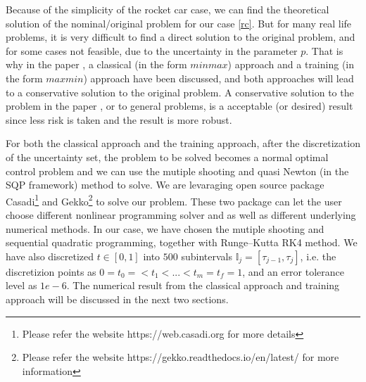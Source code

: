 \documentclass  [
  paper    = a4,
  BCOR     = 10mm,
  twoside,
  fontsize = 12pt,
  fleqn,
  toc      = bibnumbered,
  toc      = listofnumbered,
  numbers  = noendperiod,
  headings = normal,
  listof   = leveldown,
  version  = 3.03
]                                       {scrreprt}
\newcommand{\<}{\langle}
\renewcommand{\>}{\rangle}
\begin{document}

Because of the simplicity of the rocket car case, we can find the theoretical solution of the nominal/original problem for our case \ref{rc}. But for many real life problems, it is very difficult to find a direct solution to the original problem, and for some cases not feasible, due to the uncertainty in the parameter $p$. That is why in the paper \cite{MatSch22}, a classical (in the form $minmax$) approach and a training (in the form $maxmin$) approach have been discussed, and both approaches will lead to a conservative solution to the original problem. A conservative solution to the problem in the paper \cite{MatSch22}, or to general problems,  is a acceptable (or desired) result since less risk is taken and the result is more robust. %

For both the classical approach and the training approach, after the discretization of the uncertainty set, the problem to be solved becomes a normal optimal control problem and we can use the mutiple shooting and quasi Newton (in the SQP framework) method to solve. We are levaraging open source package Casadi\footnote{Please refer the website https://web.casadi.org for more details} and Gekko\footnote{Please refer the website https://gekko.readthedocs.io/en/latest/ for more information} to solve our problem. These two package can let the user choose different nonlinear programming solver and as well as different underlying numerical methods. In our case, we have chosen the mutiple shooting and sequential quadratic programming, together with Runge–Kutta RK4 method. We have also discretized $t \in [0,1]$ into $500$ subintervals $\mathbb{I}_j = [\tau_{j-1}, \tau_j]$, i.e. the discretizion points as $0 = t_0 =  < t_1 < ... < t_m = t_f =1 $, and an error tolerance level as $1e-6$. The numerical result from the classical approach and training approach will be discussed in the next two sections. 
\end{document}
